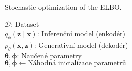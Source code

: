\begin{algorithm}[H]
    \caption{Stochastic optimization of the ELBO.}\label{alg:reparam_trick}
        \KwData{}
                \hspace{6mm}$\mathcal{D}$: Dataset\\
                \hspace{6mm}$q_\phi(\textbf{z}\mid\textbf{x})$: Inferenční model (enkodér)\\
                \hspace{6mm}$p_\theta(\textbf{x}, \textbf{z})$: Generativní model (dekodér)\\
        \KwResult{}
        \hspace{6mm}$\boldsymbol{\theta}, \boldsymbol{\phi}$: Naučené parametry\\

        $\boldsymbol{\theta}, \boldsymbol{\phi} \gets \text{Náhodná inicializace parametrů}$

\end{algorithm}